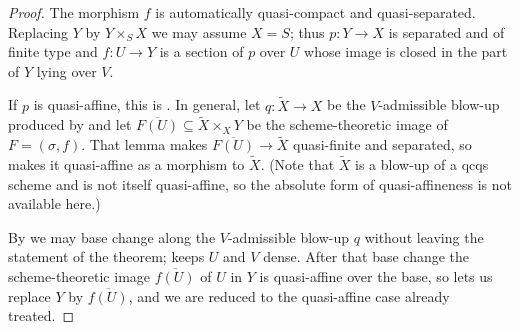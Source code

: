 \begin{proof}
  \leanok
  The morphism $f$ is automatically quasi-compact and quasi-separated.
  Replacing $Y$ by $Y\times_SX$ we may assume $X=S$; thus $p\colon Y\to X$ is
  separated and of finite type and $f\colon U\to Y$ is a section of $p$ over
  $U$ whose image is closed in the part of $Y$ lying over $V$.

  If $p$ is quasi-affine, this is
  .  In general, let
  $q\colon\widetilde X\to X$ be the $V$-admissible blow-up produced by
   and let
  $\overline{F(U)}\subseteq\widetilde X\times_XY$ be the scheme-theoretic image
  of $F=(\sigma,f)$.  That lemma makes
  $\overline{F(U)}\to\widetilde X$ quasi-finite and separated, so
   makes it
  quasi-affine as a morphism to $\widetilde X$.  (Note that $\widetilde X$ is a
  blow-up of a qcqs scheme and is not itself quasi-affine, so the absolute form
  of quasi-affineness is not available here.)

  By  we may base change
  along the $V$-admissible blow-up $q$ without leaving the statement of the
  theorem;  keeps $U$ and
  $V$ dense.  After that base change the scheme-theoretic image
  $\overline{f(U)}$ of $U$ in $Y$ is quasi-affine over the base, so
   lets us replace $Y$ by
  $\overline{f(U)}$, and we are reduced to the quasi-affine case already
  treated.
\end{proof}

